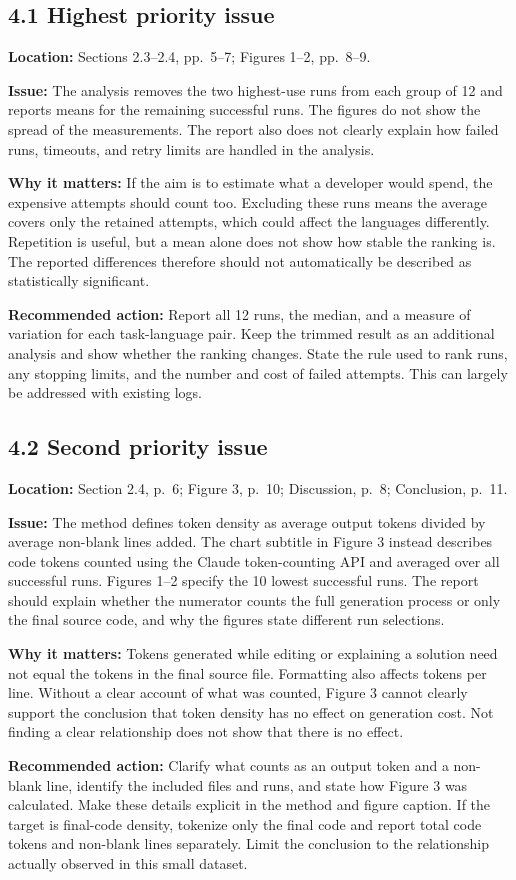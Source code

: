 \documentclass[11pt,a4paper]{extarticle}
\newcommand{\response}[1]{%
  {\color{responsegray}\fontsize{10.5}{11.8}\selectfont #1\par}\vspace{5pt}%
}
\begin{document}
\subsection*{4.1 Highest priority issue}
\response{\textbf{Location:} Sections 2.3--2.4, pp.~5--7; Figures 1--2, pp.~8--9.}
\response{\textbf{Issue:} The analysis removes the two highest-use runs from each group of 12 and reports means for the remaining successful runs. The figures do not show the spread of the measurements. The report also does not clearly explain how failed runs, timeouts, and retry limits are handled in the analysis.}
\response{\textbf{Why it matters:} If the aim is to estimate what a developer would spend, the expensive attempts should count too. Excluding these runs means the average covers only the retained attempts, which could affect the languages differently. Repetition is useful, but a mean alone does not show how stable the ranking is. The reported differences therefore should not automatically be described as statistically significant.}
\begin{samepage}
\response{\textbf{Recommended action:} Report all 12 runs, the median, and a measure of variation for each task-language pair. Keep the trimmed result as an additional analysis and show whether the ranking changes. State the rule used to rank runs, any stopping limits, and the number and cost of failed attempts. This can largely be addressed with existing logs.}
\end{samepage}

\subsection*{4.2 Second priority issue}
\response{\textbf{Location:} Section 2.4, p.~6; Figure 3, p.~10; Discussion, p.~8; Conclusion, p.~11.}
\response{\textbf{Issue:} The method defines token density as average output tokens divided by average non-blank lines added. The chart subtitle in Figure 3 instead describes code tokens counted using the Claude token-counting API and averaged over all successful runs. Figures 1--2 specify the 10 lowest successful runs. The report should explain whether the numerator counts the full generation process or only the final source code, and why the figures state different run selections.}
\response{\textbf{Why it matters:} Tokens generated while editing or explaining a solution need not equal the tokens in the final source file. Formatting also affects tokens per line. Without a clear account of what was counted, Figure 3 cannot clearly support the conclusion that token density has no effect on generation cost. Not finding a clear relationship does not show that there is no effect.}
\response{\textbf{Recommended action:} Clarify what counts as an output token and a non-blank line, identify the included files and runs, and state how Figure 3 was calculated. Make these details explicit in the method and figure caption. If the target is final-code density, tokenize only the final code and report total code tokens and non-blank lines separately. Limit the conclusion to the relationship actually observed in this small dataset.}
\end{document}
